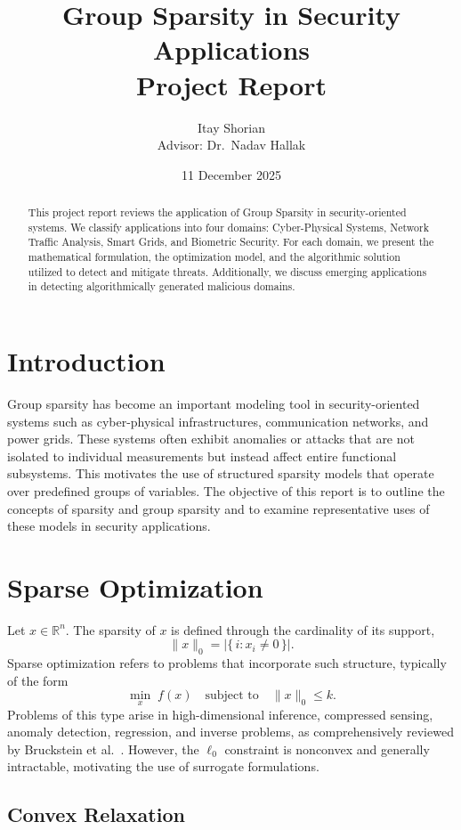 \documentclass[12pt]{article}
\title{\textbf{Group Sparsity in Security Applications}\\[0.4em]\large Project Report}
\author{Itay Shorian \\ Advisor: Dr.\ Nadav Hallak}
\date{11 December 2025}
\begin{document}
\maketitle
\begin{abstract}
\noindent
This project report reviews the application of Group Sparsity in security-oriented systems. We classify applications into four domains: Cyber-Physical Systems, Network Traffic Analysis, Smart Grids, and Biometric Security. For each domain, we present the mathematical formulation, the optimization model, and the algorithmic solution utilized to detect and mitigate threats. Additionally, we discuss emerging applications in detecting algorithmically generated malicious domains.
\end{abstract}

\section{Introduction}

Group sparsity has become an important modeling tool in security-oriented systems such as cyber-physical infrastructures, communication networks, and power grids. These systems often exhibit anomalies or attacks that are not isolated to individual measurements but instead affect entire functional subsystems. This motivates the use of structured sparsity models that operate over predefined groups of variables. The objective of this report is to outline the concepts of sparsity and group sparsity and to examine representative uses of these models in security applications.

\section{Sparse Optimization}

Let $x \in \mathbb{R}^n$. The sparsity of $x$ is defined through the cardinality of its support,
\[
\|x\|_0 = |\{\, i : x_i \neq 0 \,\}|.
\]
Sparse optimization refers to problems that incorporate such structure, typically of the form
\[
\min_{x} \; f(x) \quad \text{subject to} \quad \|x\|_0 \le k.
\]
Problems of this type arise in high-dimensional inference, compressed sensing, anomaly detection, regression, and inverse problems, as comprehensively reviewed by Bruckstein et al.~\cite{BDL}. However, the $\ell_0$ constraint is nonconvex and generally intractable, motivating the use of surrogate formulations.

\subsection{Convex Relaxation}
\end{document}
